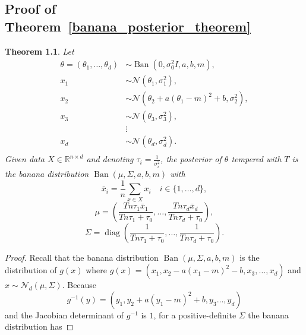 \documentclass[english,twoside,openright]{HYgraduMLDS}
\newtheorem{theorem}[lemma]{Theorem}
\newcommand{\R}{\mathbb{R}}
\newcommand{\caln}{{\mathcal{N}}}
\DeclareMathOperator{\ban}{Ban}
\DeclareMathOperator{\diag}{diag}
\begin{document}
\begin{appendices}
\myappendixtitle

\chapter{Proof of Theorem~\ref{banana_posterior_theorem}}\label{banana_posterior_theorem_proof}

\setcounter{temp_counter}{\value{lemma}}
\setcounter{temp_counter_chap}{\value{chapter}}
\renewcommand{\thelemma}{5.2}
\begin{theorem}
    Let
    \begin{align*}
        \theta = (\theta_1,\dotsc, \theta_d) &\sim
        \ban(0, \sigma_0^2I, a, b, m), \\
        x_1 &\sim \caln(\theta_1, \sigma_1^2), \\
        x_2 &\sim \caln(\theta_2 + a(\theta_1 - m)^2 + b, \sigma_2^2),\\
        x_3 &\sim \caln(\theta_3, \sigma_3^2), \\
            &\vdots \\
        x_d &\sim \caln(\theta_d, \sigma_d^2). \\
    \end{align*}
    Given data \(X\in \R^{n\times d}\) and
    denoting \(\tau_i = \frac{1}{\sigma_i^2}\),
    the posterior of \(\theta\) tempered with \(T\) is the banana distribution
    \(\ban(\mu, \Sigma, a, b, m)\)
    with
    \[
        \bar{x}_i = \frac{1}{n}\sum_{x\in X} x_{i} \quad i\in \{1, \dotsc, d\},
    \]
    \[
        \mu = \left(\frac{Tn\tau_1\bar{x}_1}{Tn\tau_1 + \tau_0},\dotsc,
        \frac{Tn\tau_d\bar{x}_d}{Tn\tau_d + \tau_0}\right),
    \]
    \[
        \Sigma = \diag\left(
            \frac{1}{Tn\tau_1 + \tau_0},\dotsc,
            \frac{1}{Tn\tau_d + \tau_0}
        \right).
    \]
\end{theorem}
\begin{proof}
  Recall that the banana distribution \(\ban(\mu, \Sigma, a, b, m)\) is the distribution of
  \(g(x)\) where \(g(x) = (x_{1}, x_{2} - a(x_{1} - m)^{2} - b, x_{3},\dotsc,x_{d})\)
  and \(x\sim \caln_{d}(\mu, \Sigma)\).
  Because
  \[
    g^{-1}(y) = (y_1, y_2 + a(y_1 - m)^2 + b, y_3\dotsc, y_d)
  \]
  and the Jacobian determinant of \(g^{-1}\) is \(1\),
  for a positive-definite \(\Sigma\) the banana distribution has

\end{proof}
\end{appendices}
\end{document}
